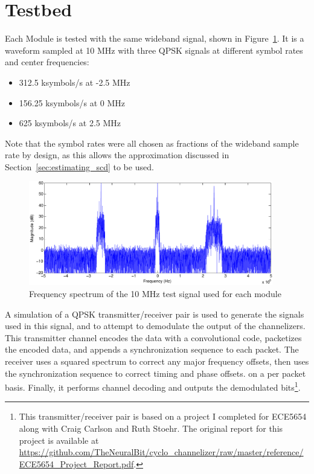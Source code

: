 \documentclass[12pt]{report}
\begin{document}
\section{Testbed}
Each Module is tested with the same wideband signal, shown in
Figure~\ref{fig:test_signal}. It is a waveform sampled at 10 MHz with three
QPSK signals at different symbol rates and center frequencies:
\begin{itemize}
    \item{312.5 ksymbols/s at -2.5 MHz}
    \item{156.25 ksymbols/s at 0 MHz}
    \item{625 ksymbols/s at 2.5 MHz}
\end{itemize}
Note that the symbol rates were all chosen as fractions of the wideband sample
rate by design, as this allows the approximation discussed in
Section~\ref{sec:estimating_scd} to be used.

\begin{figure}[h]
    \begin{center}
        \includegraphics[width=0.95\textwidth]{test_signal}
    \end{center}
    \caption{Frequency spectrum of the 10 MHz test signal used for each module}
    \label{fig:test_signal}
\end{figure}

A simulation of a QPSK transmitter/receiver pair is used to generate the
signals used in this signal, and to attempt to demodulate the output of the
channelizers. This transmitter channel encodes the data with a convolutional
code, packetizes the encoded data, and appends a synchronization sequence to
each packet. The receiver uses a squared spectrum to correct any major
frequency offsets, then uses the synchronization sequence to correct timing and
phase offsets. on a per packet basis. Finally, it performs channel decoding and
outputs the demodulated bits\footnote{This transmitter/receiver pair is based
on a project I completed for ECE5654 along with Craig Carlson and Ruth Stoehr.
The original report for this project is available at
\url{https://github.com/TheNeuralBit/cyclo_channelizer/raw/master/reference/ECE5654_Project_Report.pdf}.}.
\end{document}
